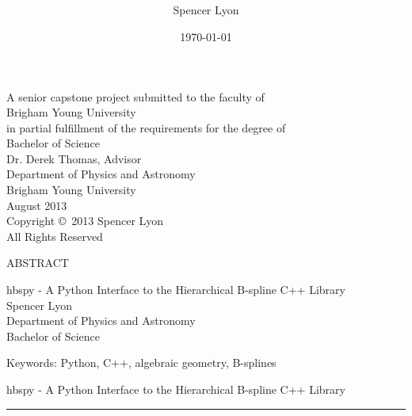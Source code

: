 \documentclass[12pt, twoside]{article}
\title{
    \vspace{-.6in}
    \usefont{OT1}{bch}{b}{n}
    \normalfont \normalsize \textsc{ } \\ [25pt]
    \horrule{0.5pt}
    \huge \thetitle \\
    \horrule{2pt}
  }
\author{
    Spencer Lyon
  }
\date{
  \normalfont \normalsize
  \today \\[-4pt] \normalsize
  }
\theoremstyle{definition} %
\numberwithin{equation}{section}
\newcommand \thetitle{hbspy -  A Python Interface to the Hierarchical B-spline C++ Library}
\begin{document}
\begin{titlepage}
  \maketitle
  \thispagestyle{empty}
  \begin{center}

  A senior capstone project submitted to the faculty of \\
  Brigham Young University\\
  in partial fulfillment of the requirements for the degree of \\[\baselineskip]
  Bachelor of Science \\ [1.5cm]

  Dr. Derek Thomas, Advisor \\ [1.5cm]

  Department of Physics and Astronomy \\[\baselineskip]
  Brigham Young University \\[\baselineskip]
  August 2013\\[2.0cm]

  Copyright \copyright\ 2013 Spencer Lyon \\[\baselineskip]

  All Rights Reserved

  \end{center}
\end{titlepage}

  \newpage
  \thispagestyle{empty}
  {\centering
  \large ABSTRACT \\ [\baselineskip]

  \normalfont \normalsize

  \thetitle \\ [\baselineskip]

  Spencer Lyon\\
  Department of Physics and Astronomy\\
  Bachelor of Science \\ [\baselineskip]
  }

  

  \vfill
  \noindent Keywords: Python, C++, algebraic geometry, B-splines

  \newpage
  \tableofcontents

\newpage
{}  %
\setcounter{page}{1}  %
\thispagestyle{empty}
\pagestyle{mainDoc}

\begin{center}
\huge{\thetitle}  %
\rule{\linewidth}{.1pt}
\end{center}







\newpage
\printbibliography

\appendix

\end{document}
